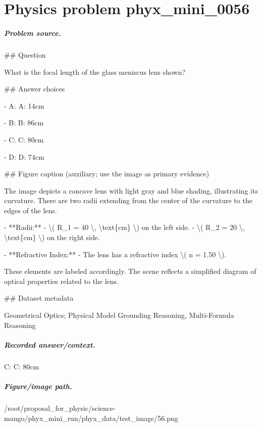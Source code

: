 
\chapter{Physics problem phyx\_mini\_0056}
\label{ch:PhyXMiniProblems_problem_phyx_mini_0056}

\paragraph{Problem source.}
\#\# Question

What is the focal length of the glass meniscus lens shown?

\#\# Answer choices

- A: A: 14cm

- B: B: 86cm

- C: C: 80cm

- D: D: 74cm

\#\# Figure caption (auxiliary; use the image as primary evidence)

The image depicts a concave lens with light gray and blue shading, illustrating its curvature. There are two radii extending from the center of the curvature to the edges of the lens. 

- **Radii:**
  - \textbackslash{}( R\_1 = 40 \textbackslash{}, \textbackslash{}text\{cm\} \textbackslash{}) on the left side.
  - \textbackslash{}( R\_2 = 20 \textbackslash{}, \textbackslash{}text\{cm\} \textbackslash{}) on the right side.

- **Refractive Index:**
  - The lens has a refractive index \textbackslash{}( n = 1.50 \textbackslash{}).

These elements are labeled accordingly. The scene reflects a simplified diagram of optical properties related to the lens.

\#\# Dataset metadata

Geometrical Optics; Physical Model Grounding Reasoning, Multi-Formula Reasoning

\paragraph{Recorded answer/context.}
C: C: 80cm

\paragraph{Figure/image path.}
/root/proposal\_for\_physic/science-mango/phyx\_mini\_run/phyx\_data/test\_image/56.png

